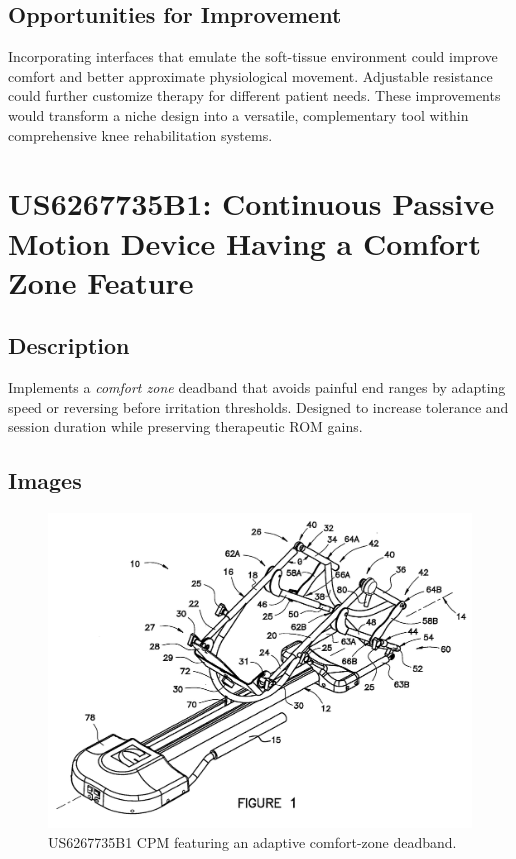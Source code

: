 \documentclass[11pt]{article}
\begin{document}
\subsection{Opportunities for Improvement}
Incorporating interfaces that emulate the soft-tissue environment could improve comfort and better approximate physiological movement. Adjustable resistance could further customize therapy for different patient needs. These improvements would transform a niche design into a versatile, complementary tool within comprehensive knee rehabilitation systems.

\section{US6267735B1: Continuous Passive Motion Device Having a Comfort Zone Feature}
\subsection{Description}
Implements a \emph{comfort zone} deadband that avoids painful end ranges by adapting speed or reversing before irritation thresholds. Designed to increase tolerance and session duration while preserving therapeutic ROM gains.
\subsection{Images}
\begin{figure}[H]
  \centering
  \includegraphics[width=0.54\linewidth]{US6267735B1_1.png}
  \caption{US6267735B1 CPM featuring an adaptive comfort-zone deadband.}
  \label{fig:US6267735B1}
\end{figure}
\end{document}
